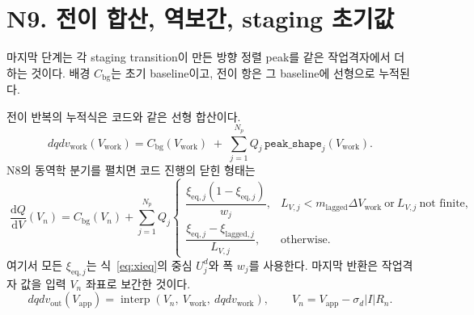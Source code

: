\documentclass[11pt,a4paper]{article}
\newcommand{\dd}{\mathrm{d}}
\newcommand{\eq}{\mathrm{eq}}
\newcommand{\app}{\mathrm{app}}
\newcommand{\bg}{\mathrm{bg}}
\newcommand{\work}{\mathrm{work}}
\newcommand{\lag}{\mathrm{lagged}}
\begin{document}
\section{N9. 전이 합산, 역보간, staging 초기값}\label{sec:N9}
마지막 단계는 각 staging transition이 만든 방향 정렬 peak를 같은 작업격자에서 더하는 것이다. 배경 $C_{\bg}$는 초기 baseline이고, 전이 항은 그 baseline에 선형으로 누적된다.

전이 반복의 누적식은 코드와 같은 선형 합산이다.
\begin{equation}
dqdv_{\work}(V_{\work})=
C_{\bg}(V_{\work})
\;+\;
\sum_{j=1}^{N_p}Q_j\,\texttt{peak\_shape}_j(V_{\work}).
\label{eq:dqdvwork}
\end{equation}
N8의 동역학 분기를 펼치면 코드 진행의 닫힌 형태는
\begin{equation}
\boxed{\;
\frac{\dd Q}{\dd V}(V_n)
=C_{\bg}(V_n)+
\sum_{j=1}^{N_p}Q_j
\begin{cases}
\dfrac{\xi_{\eq,j}(1-\xi_{\eq,j})}{w_j},
&L_{V,j}<m_{\lag}\Delta V_{\work}\ \text{or}\ L_{V,j}\ \text{not finite},\\[8pt]
\dfrac{\xi_{\eq,j}-\xi_{\lag,j}}{L_{V,j}},
&\text{otherwise}.
\end{cases}
\;}
\label{eq:masterv11}
\end{equation}
여기서 모든 $\xi_{\eq,j}$는 식~\eqref{eq:xieq}의 중심 $U_j^d$와 폭 $w_j$를 사용한다. 마지막 반환은 작업격자 값을 입력 $V_n$ 좌표로 보간한 것이다.
\begin{equation}
\boxed{\;dqdv_{\mathrm{out}}(V_{\app})=
\operatorname{interp}\!\left(V_n,\ V_{\work},\ dqdv_{\work}\right),
\qquad V_n=V_{\app}-\sigma_d|I|R_n.\;}
\label{eq:interpout}
\end{equation}
\end{document}
